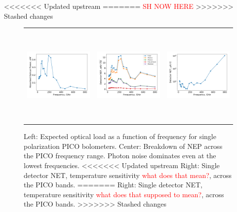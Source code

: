 \documentclass[]{spie}  %
\newcommand{\comr}[1]{\textcolor{red}{#1}}
\begin{document}
<<<<<<< Updated upstream
=======
\comr{SH NOW HERE}
>>>>>>> Stashed changes

\begin{figure} [ht]
\begin{center}
\begin{tabular}{ccc} %
\hspace{-1.4cm} \includegraphics[height=4.9cm]{system_Popt.png} & \hspace{-0.7cm} \includegraphics[height=4.9cm]{system_NEP.png} &\hspace{-0.7cm}  \includegraphics[height=4.9cm]{system_NET.png} 
\end{tabular}
\end{center}
\caption{ \label{fig:popt} \label{fig:noise} \label{fig:net} 
Left: Expected optical load as a function of frequency for single polarization PICO bolometers. 
Center: Breakdown of NEP across the PICO frequency range.  Photon noise dominates even at the lowest frequencies. 
<<<<<<< Updated upstream
Right: Single detector NET, temperature sensitivity \comr{what does that mean?},  across the PICO bands. 
=======
Right: Single detector NET, temperature sensitivity \comr{what does that supposed to mean?},  across the PICO bands. 
>>>>>>> Stashed changes
}
\end{figure} 
\end{document}
